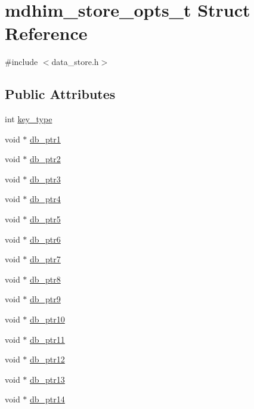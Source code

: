 \hypertarget{structmdhim__store__opts__t}{\section{mdhim\-\_\-store\-\_\-opts\-\_\-t Struct Reference}
\label{da/d76/structmdhim__store__opts__t}
}


{\ttfamily \#include $<$data\-\_\-store.\-h$>$}

\subsection*{Public Attributes}
\begin{DoxyCompactItemize}
\item 
int \hyperlink{structmdhim__store__opts__t_ae199c9a5bce7a85d67921eb57a5a7fe4}{key\-\_\-type}
\item 
void $\ast$ \hyperlink{structmdhim__store__opts__t_afc0af3a6b21e4c706234a0ca237597c1}{db\-\_\-ptr1}
\item 
void $\ast$ \hyperlink{structmdhim__store__opts__t_a5c50e7a4c3f39a01d4d3f367b67912db}{db\-\_\-ptr2}
\item 
void $\ast$ \hyperlink{structmdhim__store__opts__t_ad0e7fef8e634a3f76a01541ce670bf77}{db\-\_\-ptr3}
\item 
void $\ast$ \hyperlink{structmdhim__store__opts__t_aa5e8306974cbccdfbae67dff52ac2e2a}{db\-\_\-ptr4}
\item 
void $\ast$ \hyperlink{structmdhim__store__opts__t_ae7148251b76b8a249bf8cb09df837605}{db\-\_\-ptr5}
\item 
void $\ast$ \hyperlink{structmdhim__store__opts__t_ae65c05225844f3729e110abddb94aeb9}{db\-\_\-ptr6}
\item 
void $\ast$ \hyperlink{structmdhim__store__opts__t_a280ace85dd4bebfc827e13c1a4820c12}{db\-\_\-ptr7}
\item 
void $\ast$ \hyperlink{structmdhim__store__opts__t_a0a7c997946a09e9ea2a0d62d59e9c2dc}{db\-\_\-ptr8}
\item 
void $\ast$ \hyperlink{structmdhim__store__opts__t_aae91eaef3fcf5e7c81fd76cf9ace1a96}{db\-\_\-ptr9}
\item 
void $\ast$ \hyperlink{structmdhim__store__opts__t_a790c5061808fc0aceae877deba282647}{db\-\_\-ptr10}
\item 
void $\ast$ \hyperlink{structmdhim__store__opts__t_aa0f5dc33f1d601e8993e00429c3a7682}{db\-\_\-ptr11}
\item 
void $\ast$ \hyperlink{structmdhim__store__opts__t_a0dc18da5e24aab02d2420bdd1bb9c258}{db\-\_\-ptr12}
\item 
void $\ast$ \hyperlink{structmdhim__store__opts__t_a342c5e1e021ce230b2c374841ce04cb7}{db\-\_\-ptr13}
\item 
void $\ast$ \hyperlink{structmdhim__store__opts__t_ae933e626365836a21ff80dbdf4e74add}{db\-\_\-ptr14}
\end{DoxyCompactItemize}


